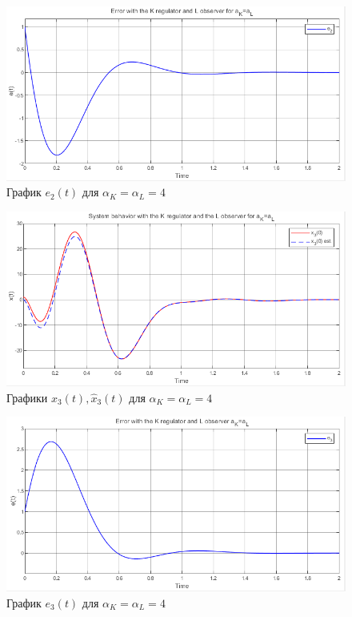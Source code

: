 \documentclass[a4paper, 12pt]{article}
\begin{document}
    \begin{figure}[H]
        \centering
        \includegraphics[scale=0.8]{2task_aK=aL_e2.png}
        \captionsetup{skip=0pt}
        \caption{График $e_2(t)$ для $\alpha_K=\alpha_L=4$}
        \label{2task_aKeqaL_e2}
    \end{figure}
    \newpage
    \vspace*{20mm}
    \begin{figure}[H]
        \centering
        \includegraphics[scale=0.8]{2task_aK=aL_x3.png}
        \captionsetup{skip=0pt}
        \caption{Графики $x_3(t),\hat{x}_3(t)$ для $\alpha_K=\alpha_L=4$}
        \label{2task_aKeqaL_x3}
    \end{figure}
    \begin{figure}[H]
        \centering
        \includegraphics[scale=0.8]{2task_aK=aL_e3.png}
        \captionsetup{skip=0pt}
        \caption{График $e_3(t)$ для $\alpha_K=\alpha_L=4$}
        \label{2task_aKeqaL_e3}
    \end{figure}
\end{document}
